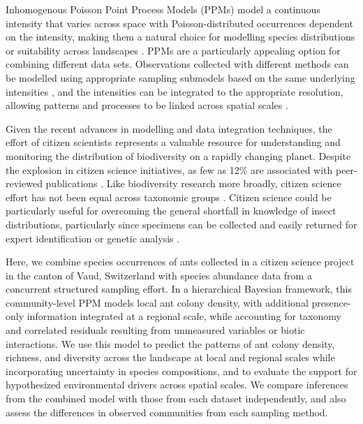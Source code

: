 \documentclass[preprint,review,times,12pt]{elsarticle}
\begin{document}
Inhomogenous Poisson Point Process Models (PPMs) model a continuous intensity that varies across space with Poisson-distributed occurrences dependent on the intensity, making them a natural choice for modelling species distributions or suitability across landscapes \citep{Renner2013a,Renner2015}. PPMs are a particularly appealing option for combining different data sets. Observations collected with different methods can be modelled using appropriate sampling submodels based on the same underlying intensities \citep{Fithian2015,Hefley2016,Koshkina2017a,Fletcher2019,Renner2019}, and the intensities can be integrated to the appropriate resolution, allowing patterns and processes to be linked across spatial scales \citep{Keil2014,Hefley2016}.

Given the recent advances in modelling and data integration techniques, the effort of citizen scientists represents a valuable resource for understanding and monitoring the distribution of biodiversity on a rapidly changing planet. Despite the explosion in citizen science initiatives, as few as 12\% are associated with peer-reviewed publications \citep{Theobald2015}. Like biodiversity research more broadly, citizen science effort has not been equal across taxonomic groups \citep{Theobald2015,Troudet2017}. Citizen science could be particularly useful for overcoming the general shortfall in knowledge of insect distributions, particularly since specimens can be collected and easily returned for expert identification or genetic analysis \citep{Pernat2020}.

Here, we combine species occurrences of ants collected in a citizen science project in the canton of Vaud, Switzerland with species abundance data from a concurrent structured sampling effort. In a hierarchical Bayesian framework, this community-level PPM models local ant colony density, with additional presence-only information integrated at a regional scale, while accounting for taxonomy and correlated residuals resulting from unmeasured variables or biotic interactions. We use this model to predict the patterns of ant colony density, richness, and diversity across the landscape at local and regional scales while incorporating uncertainty in species compositions, and to evaluate the support for hypothesized environmental drivers across spatial scales. We compare inferences from the combined model with those from each dataset independently, and also assess the differences in observed communities from each sampling method. 
\end{document}
